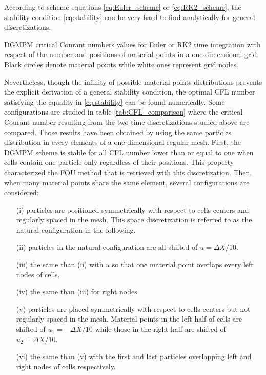 According to scheme equations \eqref{eq:Euler_scheme} or \eqref{eq:RK2_scheme}, the stability condition \eqref{eq:stability} can be very hard to find analytically for general discretizations. 
\begin{table}[h]
  \centering
  
  \caption{DGMPM critical Courant numbers values for Euler or RK2 time integration with respect of the number and positions of material points in a one-dimensional grid. Black circles denote material points while white ones represent grid nodes.}
  \label{tab:CFL_comparison}
\end{table}
Nevertheless, though the infinity of possible material points distributions prevents the explicit derivation of a general stability condition, the optimal CFL number satisfying the equality in \eqref{eq:stability} can be found numerically. Some configurations are studied in table \ref{tab:CFL_comparison} where the critical Courant number resulting from the two time discretizations studied above are compared. Those results have been obtained by using the same particles distribution in every elements of a one-dimensional regular mesh. 
First, the DGMPM scheme is stable for all CFL number lower than or equal to one when cells contain one particle only regardless of their positions. This property characterized the FOU method that is retrieved with this discretization. 
Then, when many material points share the same element, several configurations are considered:
\begin{itemize}
\item[(i)] particles are positioned symmetrically with respect to cells centers and regularly spaced in the mesh. This space discretization is referred to as the natural configuration in the following.
\item[(ii)] particles in the natural configuration are all shifted of $u=\Delta X/10$.
\item[(iii)] the same than (ii) with $u$ so that one material point overlaps every left nodes of cells.
\item[(iv)] the same than (iii) for right nodes.
\item[(v)] particles are placed symmetrically with respect to cells centers but not regularly spaced in the mesh. Material points in the left half of cells are shifted of $u_1=-\Delta X/10$ while those in the right half are shifted of $u_2=\Delta X/10$.
\item[(vi)] the same than (v) with the first and last particles overlapping left and right nodes of cells respectively.
\end{itemize}
